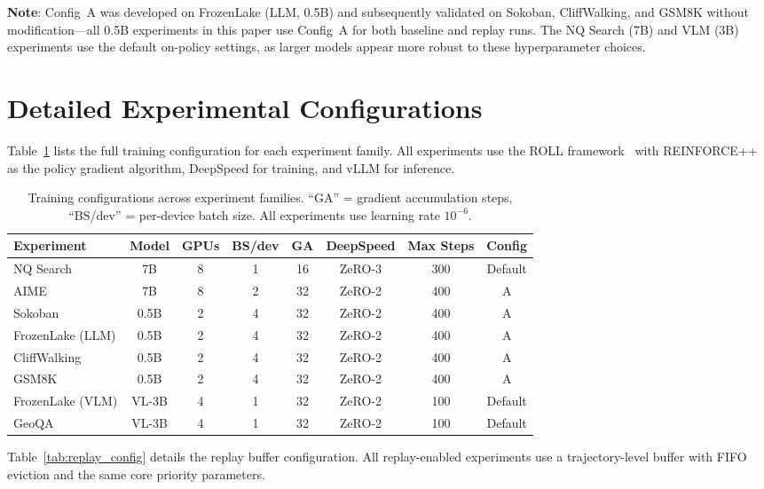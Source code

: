 \documentclass[runningheads]{llncs}
\begin{document}
\noindent\textbf{Note}: Config~A was developed on FrozenLake (LLM, 0.5B) and subsequently validated on Sokoban, CliffWalking, and GSM8K without modification---all 0.5B experiments in this paper use Config~A for both baseline and replay runs. The NQ Search (7B) and VLM (3B) experiments use the default on-policy settings, as larger models appear more robust to these hyperparameter choices.


\section{Detailed Experimental Configurations}
\label{app:configs}

Table~\ref{tab:training_config} lists the full training configuration for each experiment family. All experiments use the ROLL framework~\cite{wang2025roll} with REINFORCE++ as the policy gradient algorithm, DeepSpeed for training, and vLLM for inference.

\begin{table}[ht]
\centering
\caption{Training configurations across experiment families. ``GA'' = gradient accumulation steps, ``BS/dev'' = per-device batch size. All experiments use learning rate $10^{-6}$.}
\label{tab:training_config}
\small
\begin{tabular}{lccccccc}
    \toprule
    \textbf{Experiment} & \textbf{Model} & \textbf{GPUs} & \textbf{BS/dev} & \textbf{GA} & \textbf{DeepSpeed} & \textbf{Max Steps} & \textbf{Config} \\
    \midrule
    NQ Search & 7B & 8 & 1 & 16 & ZeRO-3 & 300 & Default \\
    AIME & 7B & 8 & 2 & 32 & ZeRO-2 & 400 & A \\
    Sokoban & 0.5B & 2 & 4 & 32 & ZeRO-2 & 400 & A \\
    FrozenLake (LLM) & 0.5B & 2 & 4 & 32 & ZeRO-2 & 400 & A \\
    CliffWalking & 0.5B & 2 & 4 & 32 & ZeRO-2 & 400 & A \\
    GSM8K & 0.5B & 2 & 4 & 32 & ZeRO-2 & 400 & A \\
    \midrule
    FrozenLake (VLM) & VL-3B & 4 & 1 & 32 & ZeRO-2 & 100 & Default \\
    GeoQA & VL-3B & 4 & 1 & 32 & ZeRO-2 & 100 & Default \\
    \bottomrule
\end{tabular}
\end{table}

Table~\ref{tab:replay_config} details the replay buffer configuration. All replay-enabled experiments use a trajectory-level buffer with FIFO eviction and the same core priority parameters.
\end{document}
